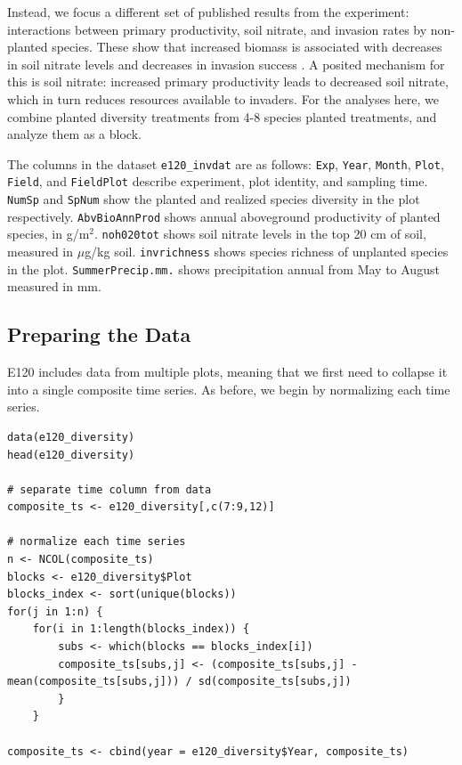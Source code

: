 Instead, we focus a different set of published results from the experiment: interactions between primary productivity, soil nitrate, and invasion rates by non-planted species. These show that increased biomass is associated with decreases in soil nitrate levels and decreases in invasion success \cite{Fargione_2005}. A posited mechanism for this is soil nitrate: increased primary productivity leads to decreased soil nitrate, which in turn reduces resources available to invaders. For the analyses here, we combine planted diversity treatments from 4-8 species planted treatments, and analyze them as a block.

The columns in the dataset \lstinline{e120_invdat} are as follows: \lstinline{Exp}, \lstinline{Year}, \lstinline{Month}, \lstinline{Plot}, \lstinline{Field}, and \lstinline{FieldPlot} describe experiment, plot identity, and sampling time. \lstinline{NumSp} and \lstinline{SpNum} show the planted and realized species diversity in the plot respectively. \lstinline{AbvBioAnnProd} shows annual aboveground productivity of planted species, in g/m$^2$. \lstinline{noh020tot} shows soil nitrate levels in the top 20 cm of soil, measured in $\mu$g/kg soil. \lstinline{invrichness} shows species richness of unplanted species in the plot. \lstinline{SummerPrecip.mm.} shows precipitation annual from May to August measured in mm.

\subsection{Preparing the Data}

E120 includes data from multiple plots, meaning that we first need to collapse it into a single composite time series. As before, we begin by normalizing each time series. 

\begin{lstlisting}
data(e120_diversity)
head(e120_diversity)

# separate time column from data
composite_ts <- e120_diversity[,c(7:9,12)]

# normalize each time series
n <- NCOL(composite_ts)
blocks <- e120_diversity$Plot
blocks_index <- sort(unique(blocks))
for(j in 1:n) {
    for(i in 1:length(blocks_index)) {
        subs <- which(blocks == blocks_index[i])
        composite_ts[subs,j] <- (composite_ts[subs,j] - mean(composite_ts[subs,j])) / sd(composite_ts[subs,j])
        }
    }

composite_ts <- cbind(year = e120_diversity$Year, composite_ts)
\end{lstlisting}

